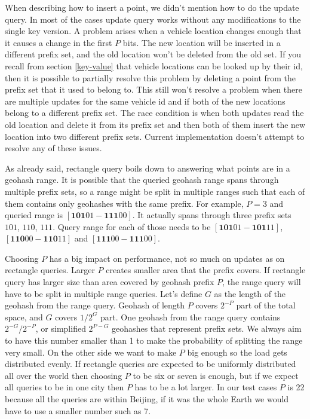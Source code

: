 \documentclass[times, utf8, diplomski]{fer}
\begin{document}
When describing how to insert a point, we didn't mention how to do the update query. In most of the cases update query works without any modifications to the single key version. A problem arises when a vehicle location changes enough that it causes a change in the first $P$ bits. The new location will be inserted in a different prefix set, and the old location won't be deleted from the old set. If you recall from section \ref{key-value} that vehicle locations can be looked up by their id, then it is possible to partially resolve this problem by deleting a point from the prefix set that it used to belong to. This still won't resolve a problem when there are multiple updates for the same vehicle id and if both of the new locations belong to a different prefix set. The race condition is when both updates read the old location and delete it from its prefix set and then both of them insert the new location into two different prefix sets. Current implementation doesn't attempt to resolve any of these issues.

As already said, rectangle query boils down to answering what points are in a geohash range. It is possible that the queried geohash range spans through multiple prefix sets, so a range might be split in multiple ranges such that each of them contains only geohashes with the same prefix. For example, $P=3$ and queried range is $[\mathbf{101}01-\mathbf{111}00]$. It actually spans through three prefix sets $101$, $110$, $111$. Query range for each of those needs to be $[\mathbf{101}01-\mathbf{101}11]$, $[\mathbf{110}00-\mathbf{110}11]$ and $[\mathbf{111}00-\mathbf{111}00]$.

Choosing $P$ has a big impact on performance, not so much on updates as on rectangle queries. Larger $P$ creates smaller area that the prefix covers. If rectangle query has larger size than area covered by geohash prefix $P$, the range query will have to be split in multiple range queries. Let's define $G$ as the length of the geohash from the range query. Geohash of length $P$ covers $2^{-P}$ part of the total space, and $G$ covers $1/2^G$ part. One geohash from the range query contains $2^{-G}/2^{-P}$, or simplified $2^{P-G}$ geohashes that represent prefix sets. We always aim to have this number smaller than 1 to make the probability of splitting the range very small. On the other side we want to make $P$ big enough so the load gets distributed evenly. If rectangle queries are expected to be uniformly distributed all over the world then choosing $P$ to be six or seven is enough, but if we expect all queries to be in one city then $P$ has to be a lot larger. In our test cases $P$ is 22 because all the queries are within Beijing, if it was the whole Earth we would have to use a smaller number such as 7.
\end{document}
